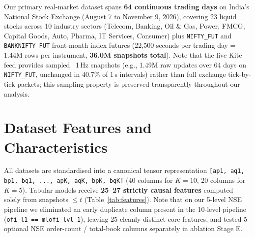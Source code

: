 \documentclass[12pt,a4paper,oneside]{report}
\newcommand{\code}[1]{\texttt{#1}}
\begin{document}
Our primary real-market dataset spans \textbf{64 continuous trading days} on India's National Stock Exchange (August 7 to November 9, 2026), covering 23 liquid stocks across 10 industry sectors (Telecom, Banking, Oil \& Gas, Power, FMCG, Capital Goods, Auto, Pharma, IT Services, Consumer) plus \code{NIFTY\_FUT} and \code{BANKNIFTY\_FUT} front-month index futures (22,500 seconds per trading day = 1.44M rows per instrument, \textbf{36.0M snapshots total}). Note that the live Kite feed provides sampled ~1\,Hz snapshots (e.g., 1.49M raw updates over 64 days on \code{NIFTY\_FUT}, unchanged in 40.7\% of 1\,s intervals) rather than full exchange tick-by-tick packets; this sampling property is preserved transparently throughout our analysis.

\section{Dataset Features and Characteristics}

All datasets are standardised into a canonical tensor representation \code{[ap1, aq1, bp1, bq1, ..., apK, aqK, bpK, bqK]} (40 columns for $K=10$, 20 columns for $K=5$). Tabular models receive \textbf{25--27 strictly causal features} computed solely from snapshots $\le t$ (Table~\ref{tab:features}). Note that on our 5-level NSE pipeline we eliminated an early duplicate column present in the 10-level pipeline (\code{ofi\_l1 == mlofi\_lvl\_1}), leaving 25 cleanly distinct core features, and tested 5 optional NSE order-count / total-book columns separately in ablation Stage E.
\end{document}
